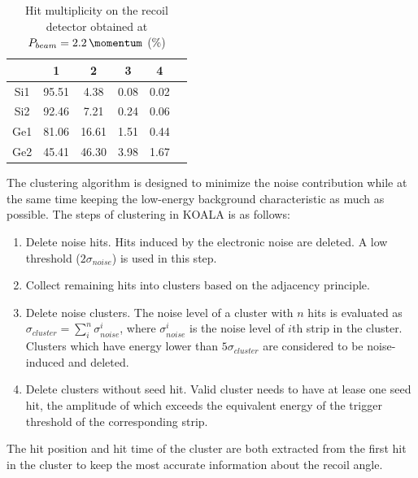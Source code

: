 \documentclass[number,5p]{elsarticle}
\begin{document}
\begin{table}[htbp]
  \label{tab:multiplicity}
  \caption{Hit multiplicity on the recoil detector obtained at $P_{beam} = \SI{2.2}{\momentum}$ (\si{\percent})}
  \centering
  \begin{tabular}{cccccc}
    \hline
     & 1& 2& 3&  4 \\
    \hline
    Si1 & 95.51 & 4.38 & 0.08 & 0.02 \\
    Si2 & 92.46 & 7.21 & 0.24 & 0.06 \\
    Ge1 & 81.06 & 16.61 & 1.51  & 0.44 \\
    Ge2 & 45.41 & 46.30 & 3.98  & 1.67 \\
    \hline
  \end{tabular}
\end{table}

The clustering algorithm is designed to minimize the noise contribution while
at the same time keeping the low-energy background characteristic as much as possible.
The steps of clustering in KOALA is as follows:
\begin{enumerate}
\item Delete noise hits. Hits induced by the electronic noise are deleted. A low
  threshold ($2\sigma_{noise}$) is used in this step.
\item Collect remaining hits into clusters based on the adjacency principle.
\item Delete noise clusters. The noise level of a cluster with $n$ hits is evaluated as
  $\sigma_{cluster} = \sum_i^n{\sigma_{noise}^i}$, where $\sigma_{noise}^i$ is
  the noise level of $i$th strip in the cluster. Clusters which have
  energy lower than $5\sigma_{cluster}$ are considered to be noise-induced and deleted.
\item Delete clusters without seed hit. Valid cluster needs to have at lease one seed hit, the
  amplitude of which exceeds the equivalent energy of the trigger threshold of
  the corresponding strip.
\end{enumerate}
The hit position and hit time of the cluster are both extracted from the first
hit in the cluster to keep the most accurate information about the recoil angle.
\end{document}
